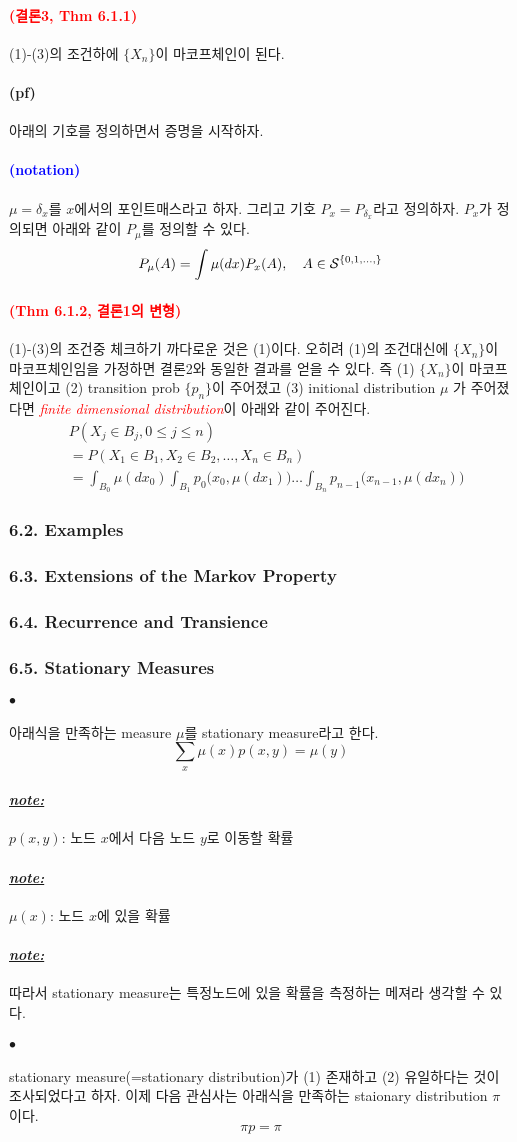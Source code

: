 \documentclass[12pt,oneside,english]{book}
\def\ck{\paragraph{\Large$\bullet$}\Large}
\def\pf{\paragraph{\Large(pf)}\Large}
\def\note{\paragraph{\Large\textit{\underline{note:}}}\Large}
\newcommand{\parablue}[1]{\paragraph{\Large\textcolor{blue}{(#1)}}\Large}
\newcommand{\parared}[1]{\paragraph{\Large\textcolor{red}{(#1)}}\Large}
\begin{document}
\parared{결론3, Thm 6.1.1} (1)-(3)의 조건하에 $\{X_n\}$이 마코프체인이 된다. 
\pf 아래의 기호를 정의하면서 증명을 시작하자. 
\parablue{notation}
$\mu=\delta_x$를 $x$에서의 포인트매스라고 하자. 그리고 기호 $P_x=P_{\delta_x}$라고 정의하자. $P_x$가 정의되면 아래와 같이 $P_{\mu}$를 정의할 수 있다. 
\[
P_{\mu}(A)=\int \mu(dx)P_x(A), \quad A \in {\cal S}^{\{0,1,\dots,\}}
\]

\parared{Thm 6.1.2, 결론1의 변형} (1)-(3)의 조건중 체크하기 까다로운 것은 (1)이다. 오히려 (1)의 조건대신에 $\{X_n\}$이 마코프체인임을 가정하면 결론2와 동일한 결과를 얻을 수 있다. 즉 (1) $\{X_n\}$이 마코프체인이고 (2) transition prob $\{p_n\}$이 주어졌고 (3) initional distribution $\mu$ 가 주어졌다면 \textcolor{red}{\emph{finite dimensional distribution}}이 아래와 같이 주어진다. 
\begin{align*}
& P(X_j \in B_j, 0\leq j \leq n) \\ 
& = P(X_1\in B_1, X_2\in B_2, \dots, X_n \in B_n)\\
& = \int_{B_0}\mu(dx_0)\int_{B_1}p_0\big(x_0,\mu(dx_1)\big)\dots\int_{B_n}p_{n-1}\big(x_{n-1},\mu(dx_n)\big)
\end{align*}

\subsubsection{6.2. Examples}

\subsubsection{6.3. Extensions of the Markov Property}

\subsubsection{6.4. Recurrence and Transience}

\subsubsection{6.5. Stationary Measures}
\ck 아래식을 만족하는 measure $\mu$를 stationary measure라고 한다. 
\[
\sum_x\mu(x)p(x,y)=\mu(y)
\]
\note $p(x,y)$: 노드 $x$에서 다음 노드 $y$로 이동할 확률
\note $\mu(x)$: 노드 $x$에 있을 확률
\note 따라서 stationary measure는 특정노드에 있을 확률을 측정하는 메져라 생각할 수 있다. 


\ck stationary measure(=stationary distribution)가 (1) 존재하고 (2) 유일하다는 것이 조사되었다고 하자. 이제 다음 관심사는 아래식을 만족하는 staionary distribution $\pi$이다. 
\[
\pi p =\pi
\]
\end{document}
